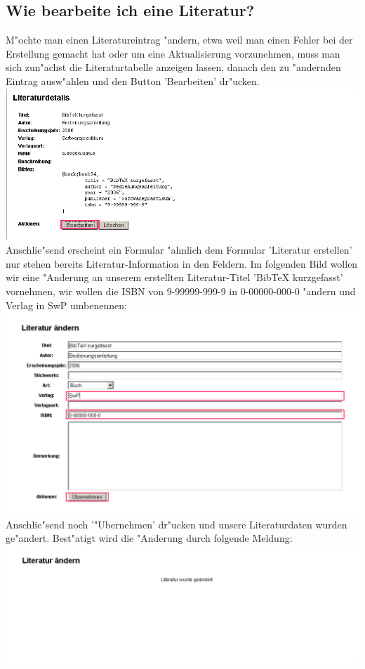 \subsection{Wie bearbeite ich eine Literatur?}
M"ochte man einen Literatureintrag "andern, etwa weil man einen Fehler bei der Erstellung gemacht hat oder um eine Aktualisierung vorzunehmen, muss man sich zun"achst die Literaturtabelle anzeigen lassen, danach den zu "andernden Eintrag ausw"ahlen und den Button 'Bearbeiten' dr"ucken.\\
\includegraphics[scale=0.8]{bearb1}\\
Anschlie"send erscheint ein Formular "ahnlich dem Formular 'Literatur erstellen' nur stehen bereits Literatur-Information in den Feldern.
Im folgenden Bild wollen wir eine "Anderung an unserem erstellten Literatur-Titel 'BibTeX kurzgefasst' vornehmen, wir wollen die ISBN von 9-99999-999-9 in 0-00000-000-0 "andern und Verlag in SwP umbenennen:\\
\includegraphics[scale=0.8]{bearb2}\\
Anschlie"send noch '"Ubernehmen' dr"ucken und unsere Literaturdaten wurden ge"andert. Best"atigt wird die "Anderung durch folgende Meldung:\\
\includegraphics[scale=0.8]{bearb3}

